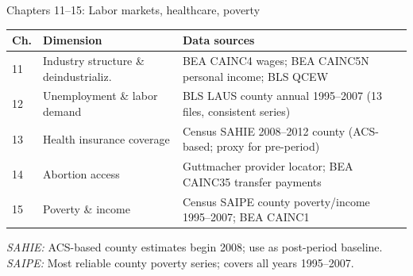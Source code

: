 \documentclass[aspectratio=169,12pt]{beamer}
\begin{document}
\begin{frame}{Chapters 11--15: Labor markets, healthcare, poverty}

\vspace{0.2em}
{\scriptsize\setlength{\tabcolsep}{4pt}%
\begin{tabular}{@{}p{}p{}p{}@{}}
\toprule
\textbf{Ch.} & \textbf{Dimension} & \textbf{Data sources} \\
\midrule
11 & Industry structure \& deindustrializ.
   & BEA CAINC4 wages; BEA CAINC5N personal income; BLS QCEW \\[1pt]
12 & Unemployment \& labor demand
   & BLS LAUS county annual 1995--2007 (13 files, consistent series) \\[1pt]
13 & Health insurance coverage
   & Census SAHIE 2008--2012 county (ACS-based; proxy for pre-period) \\[1pt]
14 & Abortion access
   & Guttmacher provider locator; BEA CAINC35 transfer payments \\[1pt]
15 & Poverty \& income
   & Census SAIPE county poverty/income 1995--2007; BEA CAINC1 \\
\bottomrule
\end{tabular}%
}

\vspace{0.25em}
{\scriptsize\color{OldMortar}
\textit{SAHIE:} ACS-based county estimates begin 2008; use as post-period baseline.
\textit{SAIPE:} Most reliable county poverty series; covers all years 1995--2007.}

\end{frame}
\end{document}
